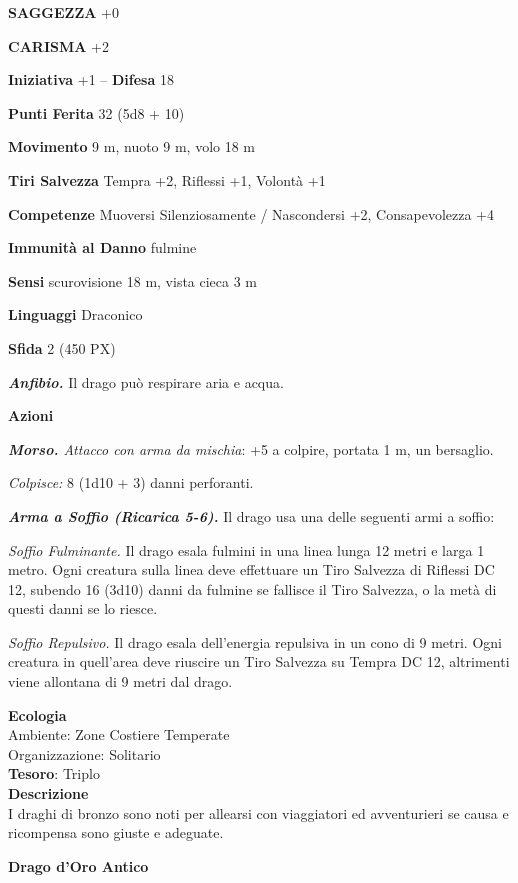 \begin{multicols}{2}
	\textbf{SAGGEZZA} +0

	\textbf{CARISMA} +2

	\textbf{Iniziativa} +1 -- \textbf{Difesa} 18

	\textbf{Punti Ferita} 32 (5d8 + 10)

	\textbf{Movimento} 9 m, nuoto 9 m, volo 18 m

	\textbf{Tiri Salvezza} Tempra +2, Riflessi +1, Volontà +1

	\textbf{Competenze} Muoversi Silenziosamente / Nascondersi +2, Consapevolezza +4

	\textbf{Immunità al Danno} fulmine

	\textbf{Sensi} scurovisione 18 m, vista cieca 3 m

	\textbf{Linguaggi} Draconico

	\textbf{Sfida} 2 (450 PX)

	\textit{\textbf{Anfibio.}} Il drago può respirare aria e acqua.

	\textbf{Azioni}

	\textit{\textbf{Morso.} Attacco con arma da mischia}: +5 a colpire,
	portata 1 m, un bersaglio.

	\textit{Colpisce:} 8 (1d10 + 3) danni perforanti.

	\textit{\textbf{Arma a Soffio (Ricarica 5-6).}} Il drago usa una delle seguenti armi a soffio:

	\textit{Soffio Fulminante.} Il drago esala fulmini in una linea lunga 12 metri e larga 1 metro. Ogni creatura sulla linea deve effettuare un Tiro Salvezza di Riflessi DC 12, subendo 16 (3d10) danni da fulmine se fallisce il Tiro Salvezza, o la metà di questi danni se lo riesce.

	\textit{Soffio Repulsivo.} Il drago esala dell'energia repulsiva in un cono di 9 metri. Ogni creatura in quell'area deve riuscire un Tiro Salvezza su Tempra DC 12, altrimenti viene allontana di 9 metri dal drago.

	\textbf{Ecologia}\\
	Ambiente: Zone Costiere Temperate\\
	Organizzazione: Solitario\\
	\textbf{Tesoro}: Triplo\\
	\textbf{Descrizione}\\
	I draghi di bronzo sono noti per allearsi con viaggiatori ed avventurieri se causa e ricompensa sono giuste e adeguate.

	\medskip{}\textbf{Drago d'Oro Antico}


\end{multicols}
